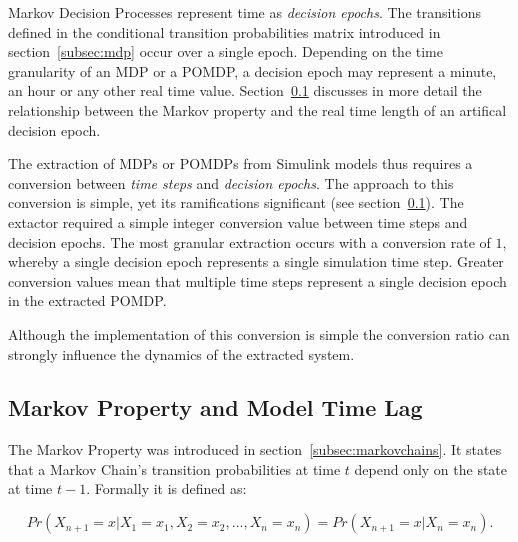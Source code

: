Markov Decision Processes represent time as \textit{decision epochs}. The transitions defined in the conditional transition probabilities matrix introduced in section~\ref{subsec:mdp} occur over a single epoch. Depending on the time granularity of an MDP or a POMDP, a decision epoch may represent a minute, an hour or any other real time value. Section~\ref{subsec:markovprop} discusses in more detail the relationship between the Markov property and the real time length of an artifical decision epoch.

The extraction of MDPs or POMDPs from Simulink models thus requires a conversion between \textit{time steps} and \textit{decision epochs}. The approach to this conversion is simple, yet its ramifications significant (see section~\ref{subsec:markovprop}). The extactor required a simple integer conversion value between time steps and decision epochs. The most granular extraction occurs with a conversion rate of $1$, whereby a single decision epoch represents a single simulation time step. Greater conversion values mean that multiple time steps represent a single decision epoch in the extracted POMDP.

Although the implementation of this conversion is simple the conversion ratio can strongly influence the dynamics of the extracted system.

\subsection{Markov Property and Model Time Lag}
\label{subsec:markovprop}

The Markov Property was introduced in section~\ref{subsec:markovchains}. It states that a Markov Chain's transition probabilities at time $t$ depend only on the state at time $t-1$. Formally it is defined as:

\[
Pr(X_{n+1}=x|X_1=x_1,X_2=x_2,...,X_n=x_n) = Pr(X_{n+1}=x|X_n=x_n).
\]

